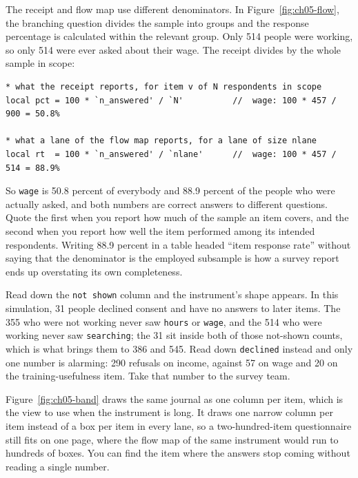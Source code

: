 The receipt and flow map use different denominators. In Figure~\ref{fig:ch05-flow}, the branching question divides the sample into groups and the response percentage is calculated within the relevant group. Only 514 people were working, so only 514 were ever asked about their wage. The receipt divides by the whole sample in scope:
\par
{\footnotesize
\begin{verbatim}
* what the receipt reports, for item v of N respondents in scope
local pct = 100 * `n_answered' / `N'          //  wage: 100 * 457 / 900 = 50.8%

* what a lane of the flow map reports, for a lane of size nlane
local rt  = 100 * `n_answered' / `nlane'      //  wage: 100 * 457 / 514 = 88.9%
\end{verbatim}
}
So \texttt{wage} is 50.8 percent of everybody and 88.9 percent of the people who were actually asked, and both numbers are correct answers to different questions. Quote the first when you report how much of the sample an item covers, and the second when you report how well the item performed among its intended respondents. Writing 88.9 percent in a table headed \enquote{item response rate} without saying that the denominator is the employed subsample is how a survey report ends up overstating its own completeness.

Read down the \texttt{not shown} column and the instrument's shape appears. In this simulation, 31 people declined consent and have no answers to later items. The 355 who were not working never saw \texttt{hours} or \texttt{wage}, and the 514 who were working never saw \texttt{searching}; the 31 sit inside both of those not-shown counts, which is what brings them to 386 and 545. Read down \texttt{declined} instead and only one number is alarming: 290 refusals on income, against 57 on wage and 20 on the training-usefulness item. Take that number to the survey team.

Figure~\ref{fig:ch05-band} draws the same journal as one column per item, which is the view to use when the instrument is long. It draws one narrow column per item instead of a box per item in every lane, so a two-hundred-item questionnaire still fits on one page, where the flow map of the same instrument would run to hundreds of boxes. You can find the item where the answers stop coming without reading a single number.

